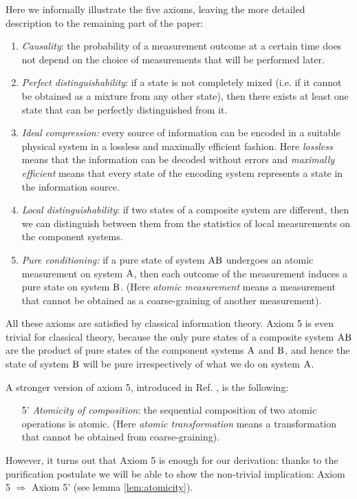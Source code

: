 \documentclass[12pt,aps,pra,showpacs,groupedaddress]{revtex4-1}
\def\rB{{\rm B}}
\begin{document}
Here we informally illustrate the five axioms, 
leaving the more detailed description to the remaining part of the paper: \begin{enumerate}
\item \emph{Causality}:  the probability of a measurement outcome at a certain time does not depend
  on the choice of measurements that will be performed later.    
\item \emph{Perfect distinguishability}:   if a state is not completely mixed (i.e. if it cannot be
  obtained as a mixture from any other state), then there exists at least one state that can be
  perfectly distinguished from it.  
\item \emph{Ideal compression:} every source of information can be encoded in a suitable physical
  system in a lossless and maximally efficient fashion. Here \emph{lossless} means that the information
  can be decoded without errors and \emph{maximally efficient} means that every state of the encoding
  system represents a state in the information source.
\item \emph{Local distinguishability}: if two states of a composite system are different, then we
  can distinguish between them from the statistics of local measurements on the component systems.
\item \emph{Pure conditioning:} if a pure state of system $\rA\rB$ undergoes an atomic measurement
  on system ${\rm A}$, then each outcome of the measurement induces a pure state on system $\rB$.  (Here
  \emph{atomic measurement} means a measurement that cannot be obtained as a coarse-graining of  another measurement).
\end{enumerate}  
All these axioms are satisfied by classical information theory.     Axiom 5 is even trivial for classical theory, because the only pure
states of a composite system $\rA\rB$ are the product of pure states
of the component systems ${\rm A}$ and $\rB$, and hence the state of
system $\rB$ will be pure irrespectively of what we do on system
${\rm A}$.  


A stronger version of axiom 5, introduced in Ref.
\cite{maurolast}, is the following:
\begin{enumerate} \item[5'] \emph{Atomicity of composition}: the
  sequential composition of two atomic operations is atomic.  (Here
  \emph{atomic transformation} means a transformation that cannot
  be obtained from coarse-graining).
\end{enumerate}
However, it turns out that Axiom 5 is enough for our derivation:
thanks to the purification postulate we will be able to show the
non-trivial implication: Axiom 5 $\Rightarrow $ Axiom 5' (see lemma
\ref{lem:atomicity}).
 
\end{document}
